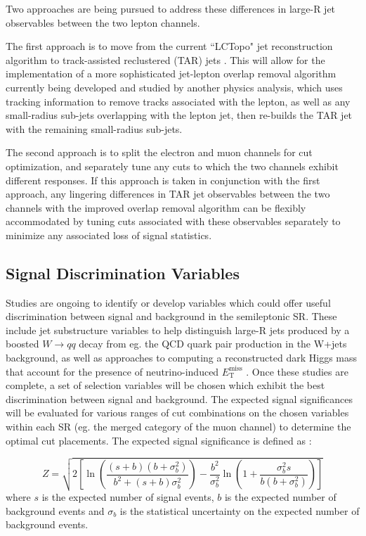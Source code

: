 \documentclass[12pt]{article}
\newcommand*{\met}{\ensuremath{E_\text{T}^\text{miss}} }
\begin{document}
Two approaches are being pursued to address these differences in large-R jet observables between the two lepton channels. 

The first approach is to move from the current ``LCTopo" jet reconstruction algorithm to track-assisted reclustered (TAR) jets \cite{TAR_jets}. This will allow for the implementation of a more sophisticated jet-lepton overlap removal algorithm currently being developed and studied by another physics analysis, which uses tracking information to remove tracks associated with the lepton, as well as any small-radius sub-jets overlapping with the lepton jet, then re-builds the TAR jet with the remaining small-radius sub-jets. 

The second approach is to split the electron and muon channels for cut optimization, and separately tune any cuts to which the two channels exhibit different responses. If this approach is taken in conjunction with the first approach, any lingering differences in TAR jet observables between the two channels with the improved overlap removal algorithm can be flexibly accommodated by tuning cuts associated with these observables separately to minimize any associated loss of signal statistics. 

\subsection{Signal Discrimination Variables}

Studies are ongoing to identify or develop variables which could offer useful discrimination between signal and background in the semileptonic SR. These include jet substructure variables to help distinguish large-R jets produced by a boosted $W\rightarrow qq$ decay from eg. the QCD quark pair production in the W+jets background, as well as approaches to computing a reconstructed dark Higgs mass that account for the presence of neutrino-induced \met\!. Once these studies are complete, a set of selection variables will be chosen which exhibit the best discrimination between signal and background. The expected signal significances will be evaluated for various ranges of cut combinations on the chosen variables within each SR (eg. the merged category of the muon channel)  to determine the optimal cut placements. The expected signal significance is defined as \cite{cowandiscovery}:

\begin{equation}
  Z = \sqrt{2\left[
    \ln\left( \frac{(s+b)(b+\sigma_b^2)}{b^2 + (s+b)\sigma_b^2} \right)
    - \frac{b^2}{\sigma_b^2}\ln\left( 1 + \frac{\sigma_b^2 s}{b(b+\sigma_b^2)} \right)
  \right]}
  \label{eq:asimovsig}
\end{equation}
\noindent where $s$ is the expected number of signal events, $b$ is the expected number of background events and $\sigma_b$ is the statistical uncertainty on the expected number of background events.
\end{document}
